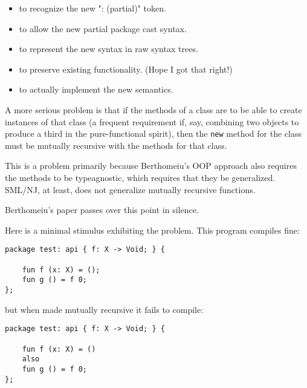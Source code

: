 \begin{itemize}
\item {} to recognize the new ": (partial)" token.
\item {} to allow the new partial package cast syntax.
\item {} to represent the new syntax in raw syntax trees.
\item {} to preserve existing functionality. (Hope I got that right!)
\item {} to actually implement the new semantics.  
\end{itemize}

A more serious problem is that if the methods of a class are 
to be able to create instances of that class (a frequent 
requirement if, say, combining two objects to produce a third 
in the pure-functional spirit), then the {\tt new} method 
for the class must be mutually recursive with the methods 
for that class.

This is a problem primarily because Berthomeiu's OOP approach 
also requires the methods to be typeagnostic, which requires 
that they be generalized.  {\sc SML/NJ}, at least, does not 
generalize mutually recursive functions.

Berthomeiu's paper passes over this point in silence.

Here is a minimal stimulus exhibiting the problem. 
This program compiles fine:

\begin{verbatim}
package test: api { f: X -> Void; } {

    fun f (x: X) = ();
    fun g () = f 0;
};
\end{verbatim}

but when made mutually recursive it fails to compile:

\begin{verbatim}
package test: api { f: X -> Void; } {

    fun f (x: X) = ()
    also
    fun g () = f 0;
};
\end{verbatim}

